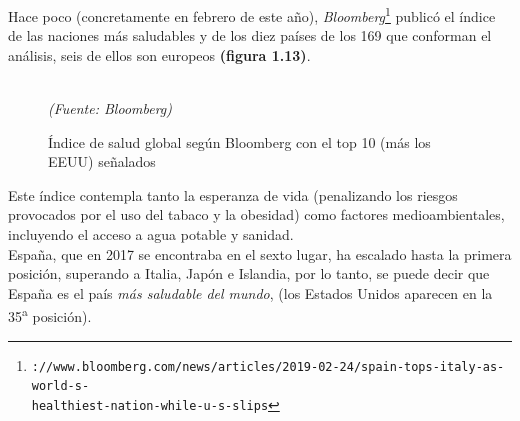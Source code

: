 Hace poco (concretamente en febrero de este año), \textit{Bloomberg}\footnote{\texttt{\small{\https://www.bloomberg.com/news/articles/2019-02-24/spain-tops-italy-as-world-s-\\healthiest-nation-while-u-s-slips}}} public\'o el índice de las naciones más saludables y de los diez países de los 169 que conforman el análisis, seis de ellos son europeos \textbf{(figura 1.13)}.
\begin{figure}[!ht]
\centering
\hspace*{0.0cm} %
\caption{Índice de salud global según Bloomberg con el top 10 (más los EEUU) señalados}\\
\textit{(Fuente: Bloomberg)}
\end{figure}

\vspace{-0.3cm}
Este índice contempla tanto la esperanza de vida (penalizando los riesgos provocados por el uso del tabaco y la obesidad) como factores medioambientales, incluyendo el acceso a agua potable y sanidad.\\

\vspace{-0.3cm}
España, que en 2017 se encontraba en el sexto lugar, ha escalado hasta la primera posición, superando a Italia, Japón e Islandia, por lo tanto, se puede decir que España es el país \textit{más saludable del mundo}, (los Estados Unidos aparecen en la 35\textsuperscript{a} posición).\\

